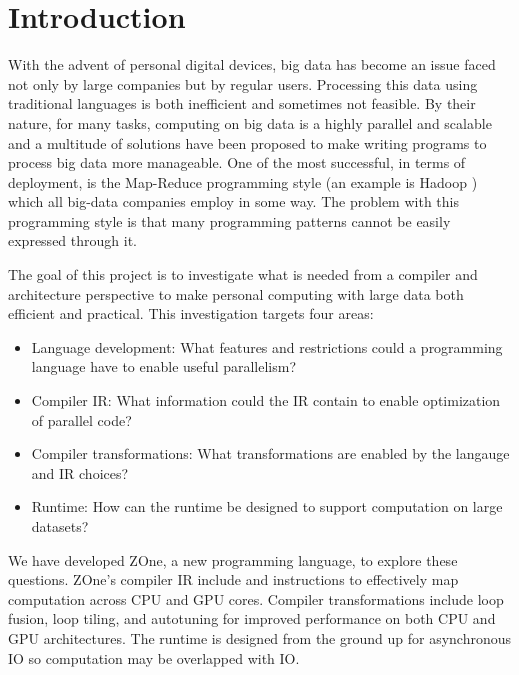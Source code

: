 \section*{Introduction}

With the advent of personal digital devices, big data has become an
issue faced not only by large companies but by regular users. Processing
this data using traditional languages is both inefficient and sometimes
not feasible. By their nature, for many tasks, computing on big data is
a highly parallel and scalable and a multitude of solutions have been
proposed to make writing programs to process big data more manageable.
One of the most successful, in terms of deployment, is the
Map-Reduce\cite{MapReduce} programming style (an example is Hadoop
\cite{Hadoop}) which
all big-data companies employ in some way. The problem with this
programming style is that many programming patterns cannot be easily
expressed through it.

The goal of this project is to investigate what is needed from a compiler and
architecture perspective to make personal computing with large data both
efficient and practical. This investigation targets four areas:
\begin{itemize}
\item Language development: What features and restrictions could a
      programming language have to enable useful parallelism?
\item Compiler IR: What information could the IR contain to enable
      optimization of parallel code?
\item Compiler transformations: What transformations are enabled by
      the langauge and IR choices?
\item Runtime: How can the runtime be designed to support computation
      on large datasets?
\end{itemize}

We have developed ZOne, a new programming language, to explore
these questions. ZOne's compiler IR include  and 
 instructions to effectively map computation across
CPU and GPU cores. Compiler transformations include loop fusion,
loop tiling, and autotuning for improved performance on both CPU
and GPU architectures. The runtime is designed from the ground up
for asynchronous IO so computation may be overlapped with IO.
